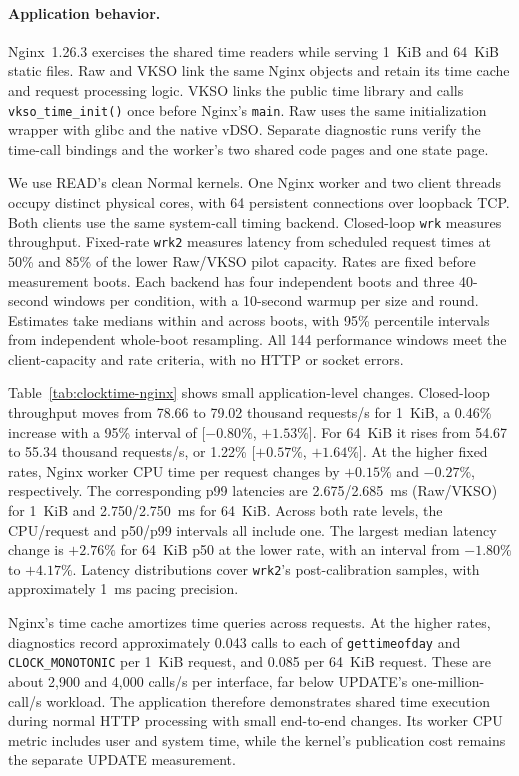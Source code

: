 \paragraph{Application behavior.}
Nginx~1.26.3 exercises the shared time readers while serving 1~KiB and
64~KiB static files. Raw and VKSO link the same Nginx objects and retain
its time cache and request processing logic. VKSO links the public time
library and calls \texttt{vkso\_time\_init()} once before Nginx's
\texttt{main}. Raw uses the same initialization wrapper with glibc and
the native vDSO. Separate diagnostic runs verify the time-call bindings
and the worker's two shared code pages and one state page.

We use READ's clean Normal kernels. One Nginx worker and two client
threads occupy distinct physical cores, with 64 persistent connections
over loopback TCP. Both clients use the same system-call timing backend.
Closed-loop \texttt{wrk} measures throughput. Fixed-rate \texttt{wrk2}
measures latency from scheduled request times at 50\% and 85\% of the
lower Raw/VKSO pilot capacity. Rates are fixed before measurement boots.
Each backend has four independent boots and three 40-second windows per
condition, with a 10-second warmup per size and round. Estimates take
medians within and across boots, with 95\% percentile intervals from
independent whole-boot resampling. All 144 performance windows meet the client-capacity
and rate criteria, with no HTTP or socket errors.



Table~\ref{tab:clocktime-nginx} shows small application-level changes.
Closed-loop throughput moves from 78.66 to 79.02 thousand requests/s for
1~KiB, a 0.46\% increase with a 95\% interval of
[$-0.80\%$, $+1.53\%$]. For 64~KiB it rises from 54.67 to 55.34 thousand
requests/s, or 1.22\% [$+0.57\%$, $+1.64\%$]. At the higher fixed
rates, Nginx worker CPU time per request changes by $+0.15\%$ and
$-0.27\%$, respectively. The corresponding p99 latencies are
2.675/2.685~ms (Raw/VKSO) for 1~KiB and 2.750/2.750~ms for 64~KiB.
Across both rate levels, the CPU/request and p50/p99 intervals all
include one. The largest median latency change is $+2.76\%$ for
64~KiB p50 at the lower rate, with an interval from $-1.80\%$ to $+4.17\%$.
Latency distributions cover \texttt{wrk2}'s post-calibration samples,
with approximately 1~ms pacing precision.

Nginx's time cache amortizes time queries across requests. At the higher
rates, diagnostics record approximately 0.043 calls to each of
\texttt{gettimeofday} and \texttt{CLOCK\_MONOTONIC} per 1~KiB request,
and 0.085 per 64~KiB request. These are about 2,900 and 4,000 calls/s
per interface, far below UPDATE's one-million-call/s workload. The
application therefore demonstrates shared time execution during normal
HTTP processing with small end-to-end changes. Its worker CPU metric
includes user and system time, while the kernel's publication cost
remains the separate UPDATE measurement.

